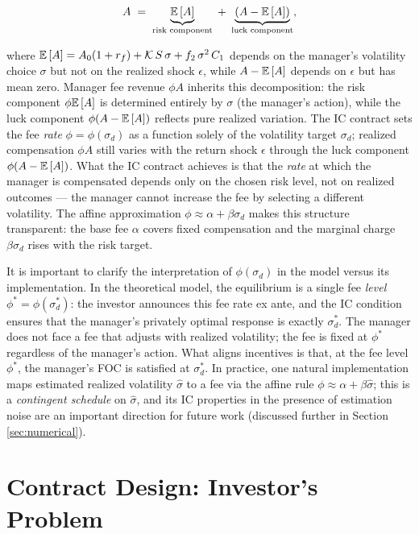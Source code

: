 \[
A \;=\; \underbrace{{\mathbb{E}}\,[A]}_{\text{risk component}} \;+\; \underbrace{(A - {\mathbb{E}}\,[A])}_{\text{luck component}},
\]

where
\({\mathbb{E}}\,[A] = A_0(1+r_f) + \mathcal{K}\,S\,\sigma + f_2\,\sigma^2\,C_1\)
depends on the manager's volatility choice \(\sigma\) but not on the
realized shock \(\epsilon\), while \(A - {\mathbb{E}}\,[A]\) depends on \(\epsilon\)
but has mean zero. Manager fee revenue \(\phi A\) inherits this
decomposition: the risk component \(\phi{\mathbb{E}}\,[A]\) is determined entirely
by \(\sigma\) (the manager's action), while the luck component
\(\phi(A-{\mathbb{E}}\,[A])\) reflects pure realized variation. The IC contract sets
the fee \emph{rate} \(\phi = \phi(\sigma_d)\) as a function solely of
the volatility target \(\sigma_d\); realized compensation \(\phi A\)
still varies with the return shock \(\epsilon\) through the luck
component \(\phi(A-{\mathbb{E}}\,[A])\). What the IC contract achieves is that the
\emph{rate} at which the manager is compensated depends only on the
chosen risk level, not on realized outcomes --- the manager cannot
increase the fee by selecting a different volatility. The affine
approximation \(\phi \approx \alpha + \beta\sigma_d\) makes this
structure transparent: the base fee \(\alpha\) covers fixed compensation
and the marginal charge \(\beta\sigma_d\) rises with the risk target.

It is important to clarify the interpretation of \(\phi(\sigma_d)\) in
the model versus its implementation. In the theoretical model, the
equilibrium is a single fee \emph{level} \(\phi^* = \phi(\sigma_d^*)\):
the investor announces this fee rate ex ante, and the IC condition
ensures that the manager's privately optimal response is exactly
\(\sigma_d^*\). The manager does not face a fee that adjusts with
realized volatility; the fee is fixed at \(\phi^*\) regardless of the
manager's action. What aligns incentives is that, at the fee level
\(\phi^*\), the manager's FOC is satisfied at \(\sigma_d^*\). In
practice, one natural implementation maps estimated realized volatility
\(\hat\sigma\) to a fee via the affine rule
\(\phi \approx \alpha + \beta\hat\sigma\); this is a \emph{contingent
schedule} on \(\hat\sigma\), and its IC properties in the presence of
estimation noise are an important direction for future work (discussed
further in Section \ref{sec:numerical}).

\section{Contract Design: Investor's Problem}\label{sec:contract}

